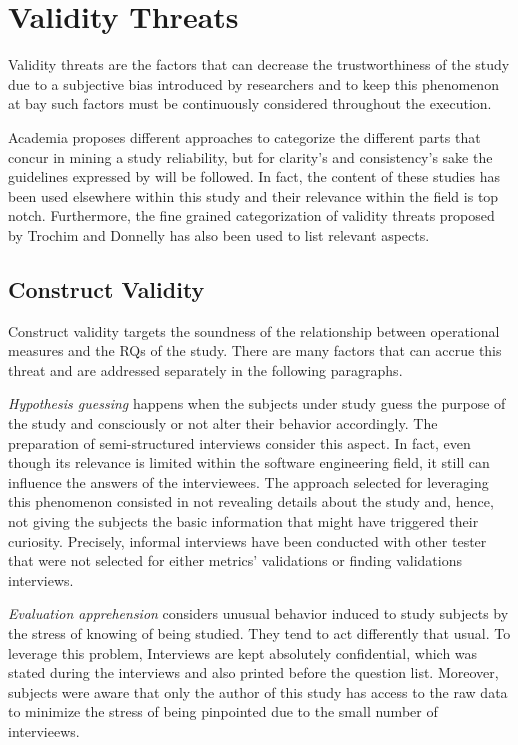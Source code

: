 \chapter{Validity Threats} \label{validity_threats}

Validity threats are the factors that can decrease the trustworthiness of the study due to a subjective bias introduced by researchers and to keep this phenomenon at bay such factors must be continuously considered throughout the execution.

Academia proposes different approaches to categorize the different parts that concur in mining a study reliability, but for clarity's and consistency's sake the guidelines expressed by \cite{case_study_guide,case_study_software_engineering} will be followed. In fact, the content of these studies has been used elsewhere within this study and their relevance within the field is top notch. Furthermore, the fine grained categorization of validity threats proposed by Trochim and Donnelly \cite{validity_threats} has also been used to list relevant aspects.

\section{Construct Validity}
Construct validity targets the soundness of the relationship between operational measures and the RQs of the study. There are many factors that can accrue this threat and are addressed separately in the following paragraphs.

    \textit{Hypothesis guessing} happens when the subjects under study guess the purpose of the study and consciously or not alter their behavior accordingly. The preparation of semi-structured interviews consider this aspect. In fact, even though its relevance is limited within the software engineering field, it still can influence the answers of the interviewees. The approach selected for leveraging this phenomenon consisted in not revealing details about the study and, hence, not giving the subjects the basic information that might have triggered their curiosity. Precisely, informal interviews have been conducted with other tester that were not selected for either metrics' validations or finding validations interviews.

    \textit{Evaluation apprehension} considers unusual behavior induced to study subjects by the stress of knowing of being studied. They tend to act differently that usual. To leverage this problem, Interviews are kept absolutely confidential, which was stated during the interviews and also printed before the question list. Moreover, subjects were aware that only the author of this study has access to the raw data to minimize the stress of being pinpointed due to the small number of intervieews.

